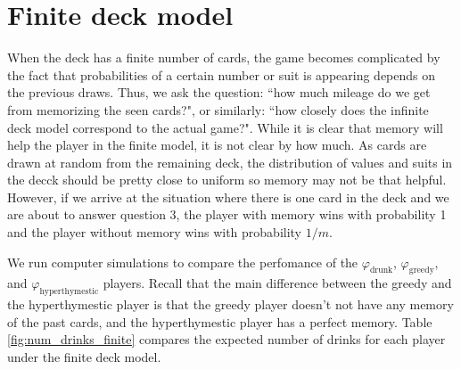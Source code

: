 \documentclass[12pt]{article}
\theoremstyle{definition}
\begin{document}


\section{Finite deck model} 
When the deck has a finite number of cards, the game becomes complicated by the fact that probabilities of a certain number or suit is appearing depends on the previous draws. Thus, we ask the question: ``how much mileage do we get from memorizing the seen cards?", or similarly: ``how closely does the infinite deck model correspond to the actual game?". While it is clear that memory will help the player in the finite model, it is not clear by how much. As cards are drawn at random from the remaining deck, the distribution of values and suits in the decck should be pretty close to uniform so memory may not be that helpful. However, if we arrive at the situation where there is one card in the deck and we are about to answer question 3, the player with memory wins with probability 1 and the player without memory wins with probability $1/m$.

We run computer simulations to compare the perfomance of the $\varphi_\text{drunk}$, $\varphi_{\text{greedy}}$, and $\varphi_\text{hyperthymestic}$ players. Recall that the main difference between the greedy and the hyperthymestic player is that the greedy player doesn't not have any memory of the past cards, and the hyperthymestic player has a perfect memory. Table \ref{fig:num_drinks_finite} compares the expected number of drinks for each player under the finite deck model. 
\newcommand{\Var}{\marthrm{Var}}
\end{document}
